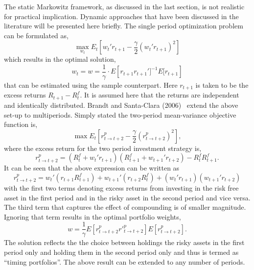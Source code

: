 The static Markowitz framework, as discussed in the last section, is not realistic for practical implication. Dynamic approaches that have been discussed in the literature will be presented here briefly. The single period optimization problem can be formulated as,
	\begin{equation} \label{eqn:periodopt}
	\max_{w_t} E_t \left[ w_t' r_{t+1} - \frac{\gamma}{2}(w_t' r_{t+1})^2 \right]
	\end{equation} 
which results in the optimal solution,
	\begin{equation} \label{eqn:periodoptimal}
	w_t= w= \frac{1}{\gamma} \cdot E \left[r_{t+1} r_{t+1}']^{-1} E[r_{t+1} \right]
	\end{equation}	
that can be estimated using the sample counterpart. Here $r_{t+1}$ is taken to be the excess returns $R_{t+1} - R_t^f$. It is assumed here that the returns are independent and identically distributed. Brandt and Santa-Clara (2006)~\cite{bransc} extend the above set-up to multiperiods. Simply stated the two-period mean-variance objective function is,
	\begin{equation} \label{eqn:twoperiodmv}
	\max E_t \left[ r^p_{t \to t+2} - \frac{\gamma}{2} ( r^p_{t \to t+2})^2 \right],
	\end{equation}
where the excess return for the two period investment strategy is,
	\begin{equation} \label{eqn:twoperexcess}
	r^p_{t \to t+2} = (R_t^f + w_t' r_{t+1}) ( R^f_{t+1} + w_{t+1}' r_{t+2}) - R_t^f R_{t+1}^f.
	\end{equation}	
It can be seen that the above expression can be written as 
	\begin{equation} \label{eqn:rewritten}
	r^p_{t \to t+2} = w_t' (r_{t+1} R_{t+1}^f) + w_{t+1}' (r_{t+2}R_t^f) + (w_t' r_{t+1})(w_{t+1}' r_{t+2})
	\end{equation}
with the first two terms denoting excess returns from investing in the risk free asset in the first period and in the risky asset in the second period and vice versa. The third term that captures the effect of compounding is of smaller magnitude. Ignoring that term results in the optimal portfolio weights,
	\begin{equation}\label{eqn:optimalweights}
	w= \frac{1}{\gamma} E\left[ r^{p}_{t \to t+2} {r'}^p_{t\to t+2} \right] E[r^{p}_{t \to t+2}].
	\end{equation}
The solution reflects the the choice between holdings the risky assets in the first period only and holding them in the second period only and thus is termed as ``timing portfolios''. The above result can be extended to any number of periods. \twomedskip


